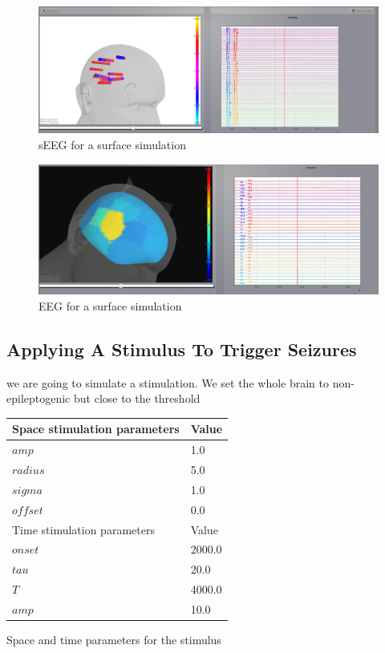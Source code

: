 \documentclass{tufte-handout}
\begin{document}
\begin{figure}[h]
  \includegraphics[width=\linewidth]{Handout_UI_ModellingAnEpilepticPatient_sEEGSurface}%
  \caption{sEEG for a surface simulation}%
  \label{fig:surf_sEEG}%
\end{figure}

\begin{figure}[h]
  \includegraphics[width=\linewidth]{Handout_UI_ModellingAnEpilepticPatient_EEGSurface}%
  \caption{EEG for a surface simulation}%
  \label{fig:surf_EEG}%
\end{figure}

\subsection{Applying A Stimulus To Trigger Seizures}

 we are going to simulate a stimulation.
We set the whole brain to non-epileptogenic but close to the threshold

\begin{margintable}
  \centering
  \selectfont
  \begin{tabular}{ll}
    \toprule
    Space stimulation parameters & Value \\
    \midrule
             $amp$          &   1.0  \\
             $radius$          &  5.0   \\
             $sigma$           &   1.0        \\
             $offset$           &   0.0   \\
    \midrule
    \midrule
    Time stimulation parameters & Value \\
    \midrule
             $onset$          &   2000.0 \\
             $tau$          &  20.0   \\
             $T$           &   4000.0        \\
             $amp$           &   10.0   \\
    \bottomrule
  \end{tabular}
  \caption{Space and time parameters for the stimulus}
  \label{tab:stimtab}
\end{margintable}
\end{document}
